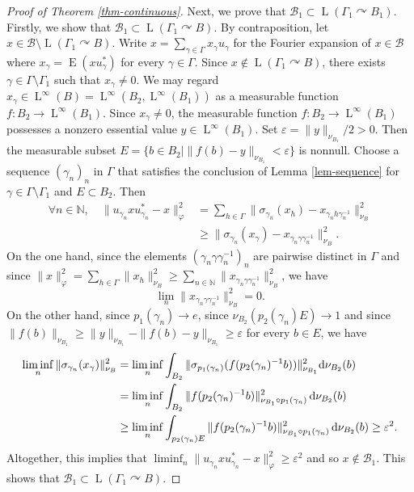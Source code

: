 \documentclass[JEP,XML,SOM,Unicode,published]{cedram}
\theoremstyle{definition}
\newcommand{\N}{\mathbb{N}}
\DeclareMathOperator{\rE}{ E}
\DeclareMathOperator{\rL}{L}
\begin{document}
\begin{proof}[Proof of Theorem \ref{thm-continuous}]
Next, we prove that $\mathscr B_1 \subset \rL(\Gamma_1 \curvearrowright B_1)$. Firstly, we show that $\mathscr B_1 \subset \rL(\Gamma_1 \curvearrowright B)$. By contraposition, let $x \in \mathscr B \setminus\rL(\Gamma_1 \curvearrowright B)$. Write $x = \sum_{\gamma \in \Gamma} x_\gamma u_\gamma$ for the Fourier expansion of $x \in \mathscr B$ where $x_\gamma = \rE(xu_\gamma^*)$ for every $\gamma \in \Gamma$. Since $x \not\in \rL(\Gamma_1 \curvearrowright B)$, there exists $\gamma \in \Gamma \setminus \Gamma_1$ such that $x_\gamma \neq 0$. We may regard $x_\gamma \in \rL^\infty(B) = \rL^\infty(B_2, \rL^\infty(B_1))$ as a measurable function $f : B_2 \to \rL^\infty(B_1)$. Since $x_\gamma \neq 0$, the measurable function \hbox{$f : B_2 \to \rL^\infty(B_1)$} possesses a nonzero essential value $y\!\in\!\rL^\infty(B_1)$. Set \hbox{$\varepsilon \!=\! \|y\|_{\nu_{B_1}}/2 \!>\! 0$}. Then the measurable subset $E = \{b \in B_2 \mid \|f(b) - y\|_{\nu_{B_1}} < \varepsilon\}$ is nonnull. Choose a sequence $(\gamma_n)_n$ in $\Gamma$ that satisfies the conclusion of Lemma \ref{lem-sequence} for $\gamma \in \Gamma \setminus \Gamma_1$ and $E \subset B_2$. Then
\begin{align*}
\forall n \in \N, \quad \|u_{\gamma_n} x u_{\gamma_n}^* - x\|_\varphi^2 &= \sum_{h \in \Gamma} \|\sigma_{\gamma_n}(x_h) - x_{\gamma_n h \gamma_n^{-1}}\|_{\nu_B}^2 \\
& \geq \|\sigma_{\gamma_n}(x_\gamma) - x_{\gamma_n \gamma \gamma_n^{-1}}\|_{\nu_B}^2.
\end{align*}
On the one hand, since the elements $(\gamma_n \gamma \gamma_n^{-1})_n$ are pairwise distinct in $\Gamma$ and since $\|x\|_\varphi^2 = \sum_{h \in \Gamma} \|x_h\|_{\nu_B}^2 \geq \sum_{n \in \N} \|x_{\gamma_n \gamma \gamma_n^{-1}}\|_{\nu_B}^2$, we have
\[
\lim_n \|x_{\gamma_n \gamma \gamma_n^{-1}}\|_{\nu_B}^2 = 0.
\]
On the other hand, since $p_1(\gamma_n) \to e$, since $\nu_{B_2}(p_2(\gamma_n) E) \to 1$ and since $\|f(b)\|_{\nu_{B_1}} \geq \|y\|_{\nu_{B_1}} - \|f(b) - y\|_{\nu_{B_1}} \geq \varepsilon$ for every $b \in E$, we have
\begin{align*}
\liminf_n\|\sigma_{\gamma_n}(x_\gamma)\|_{ \nu_B}^2 &= \liminf_n \int_{B_2} \|\sigma_{p_1(\gamma_n)}(f(p_2(\gamma_n)^{-1} b))\|^2_{\nu_{B_1}} {\rm d}\nu_{B_2}(b) \\
&= \liminf_n \int_{B_2} \|f(p_2(\gamma_n)^{-1} b)\|^2_{\nu_{B_1} \circ p_1(\gamma_n)} \, {\rm d}\nu_{B_2}(b) \\
&\geq \liminf_n \int_{p_2(\gamma_n) E} \|f(p_2(\gamma_n)^{-1} b)\|^2_{\nu_{B_1} \circ p_1(\gamma_n)} \, {\rm d}\nu_{B_2}(b) \geq \varepsilon^2.
\end{align*}
Altogether, this implies that $\liminf_n \|u_{\gamma_n} x u_{\gamma_n}^* - x\|_\varphi^2 \geq \varepsilon^2$ and so $x \not\in \mathscr B_1$. This shows that $\mathscr B_1 \subset \rL(\Gamma_1 \curvearrowright B)$.


\end{proof}
\end{document}
